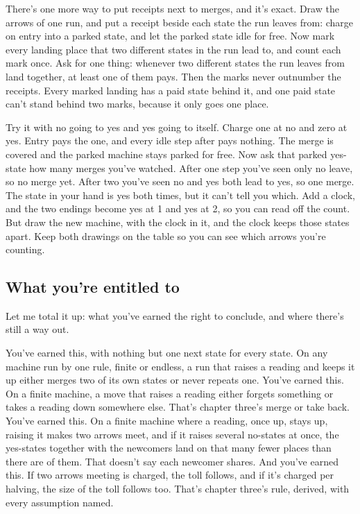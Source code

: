 \documentclass[11pt,twoside]{article}
\theoremstyle{thielethm}
\theoremstyle{thieledef}
\theoremstyle{thieledef}
\theoremstyle{thieledef}
\theoremstyle{thielethm}
\theoremstyle{thieleobs}
\theoremstyle{thielethm}
\begin{document}
There's one more way to put receipts next to merges, and it's exact. Draw the arrows of one run, and put a receipt beside each state the run leaves from: charge on entry into a parked state, and let the parked state idle for free. Now mark every landing place that two different states in the run lead to, and count each mark once. Ask for one thing: whenever two different states the run leaves from land together, at least one of them pays. Then the marks never outnumber the receipts. Every marked landing has a paid state behind it, and one paid state can't stand behind two marks, because it only goes one place.

Try it with no going to yes and yes going to itself. Charge one at no and zero at yes. Entry pays the one, and every idle step after pays nothing. The merge is covered and the parked machine stays parked for free. Now ask that parked yes-state how many merges you've watched. After one step you've seen only no leave, so no merge yet. After two you've seen no and yes both lead to yes, so one merge. The state in your hand is yes both times, but it can't tell you which. Add a clock, and the two endings become yes at 1 and yes at 2, so you can read off the count. But draw the new machine, with the clock in it, and the clock keeps those states apart. Keep both drawings on the table so you can see which arrows you're counting.

\subsection{What you're entitled to}

Let me total it up: what you've earned the right to conclude, and where there's still a way out.

You've earned this, with nothing but one next state for every state. On any machine run by one rule, finite or endless, a run that raises a reading and keeps it up either merges two of its own states or never repeats one. You've earned this. On a finite machine, a move that raises a reading either forgets something or takes a reading down somewhere else. That's chapter three's merge or take back. You've earned this. On a finite machine where a reading, once up, stays up, raising it makes two arrows meet, and if it raises several no-states at once, the yes-states together with the newcomers land on that many fewer places than there are of them. That doesn't say each newcomer shares. And you've earned this. If two arrows meeting is charged, the toll follows, and if it's charged per halving, the size of the toll follows too. That's chapter three's rule, derived, with every assumption named.
\end{document}
